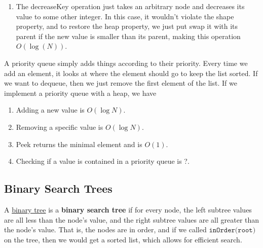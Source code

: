 \begin{enumerate}
\begin{figure}[H]
\begin{subfigure}[b]{0.48\textwidth}
        \caption{Swap the 25 node with the smaller 9 node.}
        \label{fig:remove-heap-step3}
      \end{subfigure}

      \caption{Binary heap restructuring during deletion operation}
      \label{fig:remove-heap}
    \end{figure}
    
    \item The decreaseKey operation just takes an arbitrary node and decreases its value to some other integer. In this case, it wouldn't violate the shape property, and to restore the heap property, we just put swap it with its parent if the new value is smaller than its parent, making this operation $O(\log(N))$. 
  \end{enumerate}

  \begin{definition}
    \label{def:priority-queues}
    A priority queue simply adds things according to their priority. Every time we add an element, it looks at where the element should go to keep the list sorted. If we want to dequeue, then we just remove the first element of the list. If we implement a priority queue with a heap, we have
    \begin{enumerate}
      \item Adding a new value is $O(\log N)$. 
      \item Removing a specific value is $O(\log N)$. 
      \item Peek returns the minimal element and is $O(1)$. 
      \item Checking if a value is contained in a priority queue is ?. 
    \end{enumerate}
  \end{definition}

\subsection{Binary Search Trees}

  \begin{definition}
    \label{def:binary-search-tree}
    A \hyperref[def:binary-tree]{binary tree} is a \textbf{binary search tree} if for every node, the left subtree values are all less than the node's value, and the right subtree values are all greater than the node's value. That is, the nodes are in order, and if we called $\texttt{inOrder(root)}$ on the tree, then we would get a sorted list, which allows for efficient search. 
  \end{definition}

